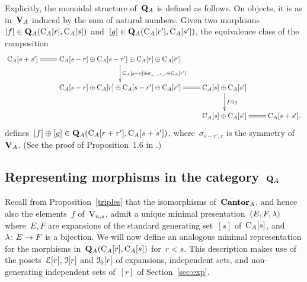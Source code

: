 


\begin{remark}\label{rem:comp}
Explicitly, the monoidal structure of~$\mathbf{Q}_A$ is defined as follows. On objects, it is as in~$\mathbf{V}_A$ induced by the sum of natural numbers. Given two morphisms~$[f]\in \mathbf{Q}_A(\mathrm{C}_A[r],\mathrm{C}_A[s])$ and~\hbox{$[g]\in \mathbf{Q}_A(\mathrm{C}_A[r'],\mathrm{C}_A[s'])$}, the equivalence class of the composition
\[
\xymatrix{\rmC_A[s+s']\ar@{=}[r]&\rmC_A[s-r]\oplus\rmC_A[s-r']\oplus\rmC_A[r]\oplus\rmC_A[r']\ar[d]^{\rmC_A[s-r]\oplus\sigma_{s-r',r}\oplus\rmC_A[r']} & &\\ 
&\rmC_A[s-r]\oplus\rmC_A[r]\oplus\rmC_A[s-r']\oplus\rmC_A[r']\ar@{=}[r]&\rmC_A[s]\oplus\rmC_A[s']\ar[d]^-{f\oplus g}\\
 &&\rmC_A[s]\oplus\rmC_A[s']\ar@{=}[r]&\rmC_A[s+s'].}
\]
defines~$[f]\oplus [g]\in \mathbf{Q}_A(\mathrm{C}_A[r+r'],\mathrm{C}_A[s+s'])$, where~$\sigma_{s-r',r}$ is the symmetry of~$\mathbf{V}_A$. (See the proof of Proposition~1.6 in \cite{Randal-Williams+Wahl}.) 
\end{remark} 


\subsection{Representing morphisms in the category~$\mathbf{Q}_A$}



Recall from Proposition~\ref{triples} that the isomorphisms of~$\mathbf{Cantor}_A$, and hence also the elements~$f$ of~$\mathrm{V}_{n,s}$, admit a unique minimal
presentation~$(E,F,\lambda)$ where~$E,F$ are expansions of the standard generating set~$[s]$
of~$\mathrm{C}_A[s]$, and~$\lambda\colon E\to F$ is a bijection. 
We will now define an analogous minimal representation for the morphisms in~$\mathbf{Q}_A(\mathrm{C}_A[r],\mathrm{C}_A[s])$ for~\hbox{$r<s$}.
This description makes use of the posets~$\mathcal{E}[r], \, \mathcal{I}[r]$ and $\mathcal{I}_0[r]$ of  expansions, independent sets, and non-generating independent sets of~$[r]$ of Section~\ref{sec:exp}. 





